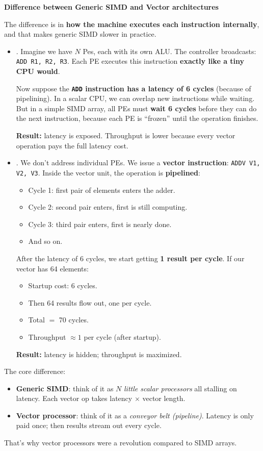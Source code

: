 \begin{flushleft}
    \textcolor{Green3}{ \textbf{Difference between Generic SIMD and Vector architectures}}
\end{flushleft}
The difference is in \textbf{how the machine executes each instruction internally}, and that makes generic SIMD slower in practice.
\begin{itemize}
    \item {}. Imagine we have $N$ Pes, each with its own ALU. The controller broadcasts: \texttt{ADD R1, R2, R3}. Each PE executes this instruction \textbf{exactly like a tiny CPU would}.

    \highspace
    Now suppose the \textbf{\texttt{ADD} instruction has a latency of 6 cycles} (because of pipelining). In a scalar CPU, we can overlap new instructions while waiting. But in a simple SIMD array, all PEs must \textbf{wait 6 cycles} before they can do the next instruction, because each PE is ``frozen'' until the operation finishes.

    \highspace
    \textbf{Result:} latency is exposed. Throughput is lower because every vector operation pays the full latency cost.


    \item {}. We don't address individual PEs. We issue a \textbf{vector instruction}: \texttt{ADDV V1, V2, V3}. Inside the vector unit, the operation is \textbf{pipelined}:
    \begin{itemize}
        \item Cycle 1: first pair of elements enters the adder.
        \item Cycle 2: second pair enters, first is still computing.
        \item Cycle 3: third pair enters, first is nearly done.
        \item And so on.
    \end{itemize}
    After the latency of 6 cycles, we start getting \textbf{1 result per cycle}. If our vector has 64 elements:
    \begin{itemize}
        \item Startup cost: 6 cycles.
        \item Then 64 results flow out, one per cycle.
        \item Total $=$ 70 cycles.
        \item Throughput $\approx 1$ per cycle (after startup).
    \end{itemize}
    \textbf{Result:} latency is hidden; throughput is maximized.
\end{itemize}
The core difference:
\begin{itemize}
    \item \textbf{Generic SIMD}: think of it as $N$ \emph{little scalar processors} all stalling on latency. Each vector op takes latency $\times$ vector length.
    \item \textbf{Vector processor}: think of it as a \emph{conveyor belt (pipeline)}. Latency is only paid once; then results stream out every cycle.
\end{itemize}
That's why vector processors were a revolution compared to \naive SIMD arrays.